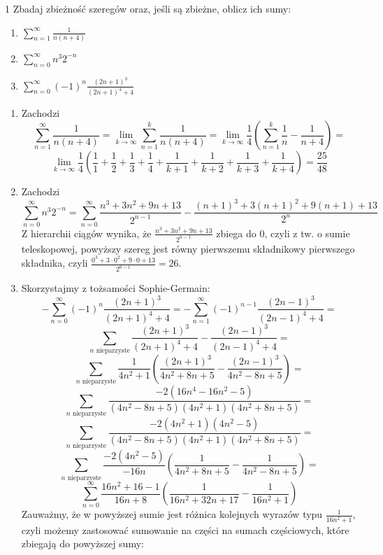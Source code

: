 \documentclass{../note}
\begin{document}
\begin{zadanie}{1}
Zbadaj zbieżność szeregów oraz, jeśli są zbieżne, oblicz ich sumy:
\begin{enumerate}[label=(\alph*)]
    \item $\sum_{n=1}^{\infty}\frac{1}{n(n+4)}$
    \item $\sum_{n=0}^{\infty}n^{3}2^{-n}$
    \item $\sum_{n=0}^{\infty}(-1)^{n}\frac{(2n+1)^{3}}{(2n+1)^{4}+4}$
\end{enumerate}
\end{zadanie}
\begin{rozwiazanie}
\begin{enumerate}[label=(\alph*)]
    \item Zachodzi
    \[\sum_{n=1}^{\infty}\frac{1}{n(n+4)} = \lim_{k\to\infty} \sum_{n=1}^{k}\frac{1}{n(n+4)} = \lim_{k\to\infty} \frac14\left(\sum_{n=1}^{k}\frac{1}{n} - \frac{1}{n+4}\right) =\]
    \[\lim_{k\to\infty} \frac14\left(\frac11 + \frac12 + \frac13 + \frac14 + \frac{1}{k+1} + \frac{1}{k+2} + \frac{1}{k+3} + \frac{1}{k+4}\right) = \frac{25}{48}\]
    \item Zachodzi
    \[\sum_{n=0}^{\infty}n^{3}2^{-n} = \sum_{n=0}^{\infty} \frac{n^3+3n^2+9n+13}{2^{n-1}} - \frac{(n+1)^3+3(n+1)^2+9(n+1)+13}{2^n}\]
    Z hierarchii ciągów wynika, że $\frac{n^3+3n^2+9n+13}{2^{n-1}}$ zbiega do 0, czyli z tw. o sumie teleskopowej, powyższy szereg jest równy pierwszemu składnikowy pierwszego składnika, czyli $\frac{0^3+3\cdot0^2+9\cdot0+13}{2^{0-1}} = 26$.
    \item Skorzystajmy z tożsamości Sophie-Germain:
    \[-\sum_{n=0}^{\infty}(-1)^{n}\frac{(2n+1)^{3}}{(2n+1)^{4}+4} = -\sum_{n=1}^{\infty}(-1)^{n-1} \frac{(2n-1)^{3}}{(2n-1)^{4}+4} =\]
    \[\sum_{n \text{ nieparzyste}}\frac{(2n+1)^{3}}{(2n+1)^{4}+4} - \frac{(2n-1)^{3}}{(2n-1)^{4}+4} =\]
    \[ \sum_{n \text{ nieparzyste}}\frac{1}{4n^2+1}\left(\frac{(2n+1)^{3}}{4n^2+8n+5} - \frac{(2n-1)^{3}}{4n^2-8n+5}\right) =\]
    \[ \sum_{n \text{ nieparzyste}} \frac{-2(16n^4-16n^2-5)}{(4n^2-8n+5)(4n^2+1)(4n^2+8n+5)} =\]
    \[\sum_{n \text{ nieparzyste}} \frac{-2(4n^2+1)(4n^2-5)}{(4n^2-8n+5)(4n^2+1)(4n^2+8n+5)} =\]
    \[\sum_{n \text{ nieparzyste}} \frac{-2(4n^2-5)}{-16n}\left(\frac{1}{4n^2+8n+5} - \frac{1}{4n^2-8n+5}\right) =\]
    \[\sum_{n=0}^{\infty} \frac{16n^2+16-1}{16n+8}\left(\frac{1}{16n^2+32n+17} - \frac{1}{16n^2+1}\right)\]
    Zauważmy, że w powyższej sumie jest różnica kolejnych wyrazów typu $\frac{1}{16n^2+1}$, czyli możemy zastosować sumowanie na części na sumach częściowych, które zbiegają do powyższej sumy:

\end{enumerate}
\end{rozwiazanie}
\end{document}
